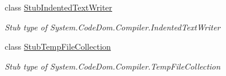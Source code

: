 \begin{DoxyCompactItemize}
class \hyperlink{class_system_1_1_code_dom_1_1_compiler_1_1_fakes_1_1_stub_indented_text_writer}{Stub\-Indented\-Text\-Writer}
\begin{DoxyCompactList}\small\item\em Stub type of System.\-Code\-Dom.\-Compiler.\-Indented\-Text\-Writer\end{DoxyCompactList}\item 
class \hyperlink{class_system_1_1_code_dom_1_1_compiler_1_1_fakes_1_1_stub_temp_file_collection}{Stub\-Temp\-File\-Collection}
\begin{DoxyCompactList}\small\item\em Stub type of System.\-Code\-Dom.\-Compiler.\-Temp\-File\-Collection\end{DoxyCompactList}\end{DoxyCompactItemize}
